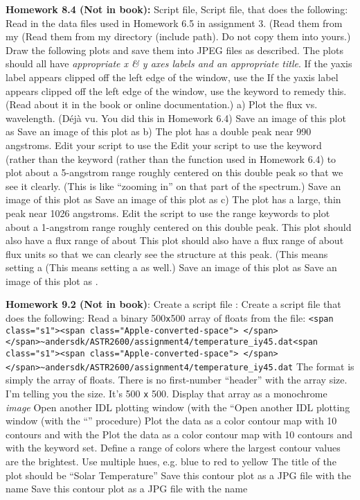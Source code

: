 \documentclass{article}
\begin{document}
\begin{spacing}{1.0}
\textbf{Homework 8.4 (Not in book):} Script file,  Script file,  that does the following:
Read in the data files used in Homework 6.5 in assignment 3. (Read them from my (Read them from my  directory (include path). Do not copy them into yours.)
Draw the following plots and save them into JPEG files as described. The plots should all have \emph{appropriate x & y axes labels and an appropriate title}.
If the yaxis label appears clipped off the left edge of the window, use the If the yaxis label appears clipped off the left edge of the window, use the  keyword to remedy this. (Read about it in the book or online documentation.)
a) Plot the flux vs. wavelength. (Déjà vu. You did this in Homework 6.4)
Save an image of this plot as Save an image of this plot as 
b) The plot has a double peak near 990 angstroms.  
Edit your script to use the Edit your script to use the  keyword (rather than the  keyword (rather than the  function used in Homework 6.4) to plot about a 5-angstrom range roughly centered on this double peak so that we see it clearly. (This is like “zooming in” on that part of the spectrum.)
Save an image of this plot as Save an image of this plot as 
c) The plot has a large, thin peak near 1026 angstroms.
Edit the script to use the range keywords to plot about a 1-angstrom range roughly centered on this double peak. This plot should also have a flux range of about This plot should also have a flux range of about  flux units so that we can clearly see the structure at this peak. (This means setting a (This means setting a  as well.)
Save an image of this plot as Save an image of this plot as .

\textbf{Homework 9.2 (Not in book)}: Create a script file : Create a script file  that does the following:
Read a binary 500\verb|x|500 array of floats from the file:
\verb|<span class="s1"><span class="Apple-converted-space"> </span></span>~andersdk/ASTR2600/assignment4/temperature_iy45.dat|\verb|<span class="s1"><span class="Apple-converted-space"> </span></span>~andersdk/ASTR2600/assignment4/temperature_iy45.dat|
The format is simply the array of floats. 
 There is no first-number “header” with the array size. I’m telling you the size. It’s 500 \verb|x| 500.
Display that array as a monochrome \emph{image}
Open another IDL plotting window (with the “Open another IDL plotting window (with the “” procedure)
Plot the data as a color contour map with 10 contours and with the Plot the data as a color contour map with 10 contours and with the  keyword set.
 Define a range of colors where the largest contour values are the brightest.  
 Use multiple hues, e.g. blue to red to yellow
The title of the plot should be “Solar Temperature”
Save this contour plot as a JPG file with the name Save this contour plot as a JPG file with the name 


\end{spacing}
\end{document}
